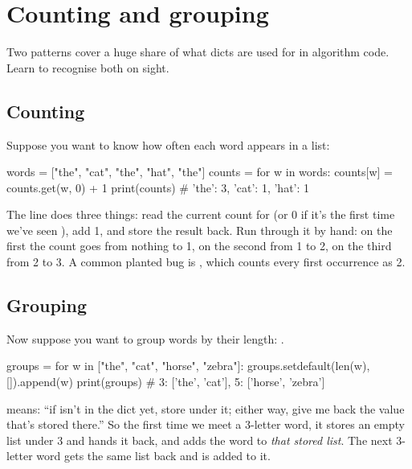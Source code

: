 \documentclass[10pt,a4paper]{article}
\begin{document}
\section{Counting and grouping}
Two patterns cover a huge share of what dicts are used for in algorithm code. Learn to recognise both on sight.
\subsection{Counting}
Suppose you want to know how often each word appears in a list:
\begin{pycode}
words = ["the", "cat", "the", "hat", "the"]
counts = {}
for w in words:
    counts[w] = counts.get(w, 0) + 1
print(counts)        # {'the': 3, 'cat': 1, 'hat': 1}
\end{pycode}
The line  does three things: read the current count for  (or 0 if it’s the first time we’ve seen ), add 1, and store the result back. Run through it by hand: on the first  the count goes from nothing to 1, on the second from 1 to 2, on the third from 2 to 3.
A common planted bug is , which counts every first occurrence as 2.
\subsection{Grouping}
Now suppose you want to group words by their length: .
\begin{pycode}
groups = {}
for w in ["the", "cat", "horse", "zebra"]:
    groups.setdefault(len(w), []).append(w)
print(groups)        # {3: ['the', 'cat'], 5: ['horse', 'zebra']}
\end{pycode}
 means: “if  isn’t in the dict yet, store  under it; either way, give me back the value that’s stored there.” So the first time we meet a 3-letter word, it stores an empty list under 3 and hands it back, and  adds the word to \emph{that stored list}. The next 3-letter word gets the same list back and is added to it.
\end{document}
